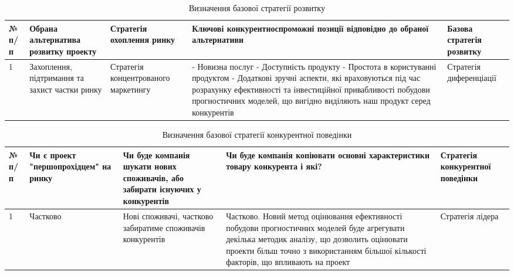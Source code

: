\begin{table}
	\begin{tabularx}{\textwidth}{|l|X|X|X|X|}
    \hline
    № п/п & Обрана альтернатива розвитку проекту & Стратегія охоплення ринку & Ключові конкурентноспроможні позиції відповідно до обраної альтернативи & Базова стратегія розвитку \\ \hline
    1 & Захоплення, підтримання та захист частки ринку & Стратегія концентрованого маркетингу & - Новизна послуг
    - Доступність продукту
    - Простота в користуванні продуктом
    - Додаткові зручні аспекти, які враховуються під час розрахунку ефективності та інвестиційної привабливості побудови прогностичних моделей, що вигідно виділяють наш продукт серед конкурентів & Стратегія диференціації \\
    \hline
    \end{tabularx}
\caption{Визначення базової стратегії розвитку} \label{tab:sometab}
\end{table}

\begin{table}
	\begin{tabularx}{\textwidth}{|l|X|X|X|X|}
    \hline
    № п/п & Чи є проект "першопрохідцем" на ринку & Чи буде компанія шукати нових споживачів, або забирати існуючих у конкурентів & Чи буде компанія копіювати основні характеристики товару конкурента і які? & Стратегія конкурентної поведінки \\ \hline
    1 & Частково & Нові споживачі, частково забиратиме споживачів конкурентів & Частково. Новий метод оцінювання ефективності побудови прогностичних моделей буде агрегувати декілька методик аналізу, що дозволить оцінювати проекти більш точно з використанням більшої кількості факторів, що впливають на проект & Стратегія лідера \\
    \hline
    \end{tabularx}
\caption{Визначення базової стратегії конкурентної поведінки} \label{tab:sometab}
\end{table}


